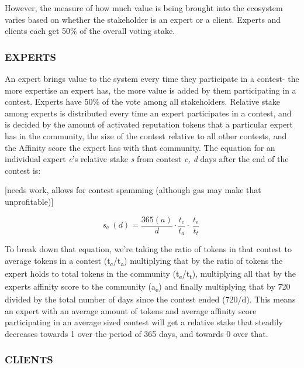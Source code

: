 However, the measure of how much value is being brought into the
ecosystem varies based on whether the stakeholder is an expert or a
client. Experts and clients each get 50\% of the overall voting stake.

\subsubsection{\texorpdfstring{\protect\hypertarget{_ad2r88v0seab}{}{\protect\hypertarget{_Toc462050418}{}{}}EXPERTS}{EXPERTS}}\label{experts}

An expert brings value to the system every time they participate in a
contest- the more expertise an expert has, the more value is added by
them participating in a contest. Experts have 50\% of the vote among all
stakeholders. Relative stake among experts is distributed every time an
expert participates in a contest, and is decided by the amount of
activated reputation tokens that a particular expert has in the
community, the size of the contest relative to all other contests, and
the Affinity score the expert has with that community. The equation for
an individual expert \emph{e}'s relative stake \emph{s} from contest
\emph{c, d} days after the end of the contest is:

{[}needs work, allows for contest spamming (although gas may make that
unprofitable){]}

\[s_{\text{e\ }}(d) = \frac{365(a)}{d} \cdot \frac{t_{c}}{t_{a}} \cdot \ \frac{t_{e}}{t_{t}}\ \]

To break down that equation, we're taking the ratio of tokens in that
contest to average tokens in a contest
(t\textsubscript{c}/t\textsubscript{a}) multiplying that by the ratio of
tokens the expert holds to total tokens in the community
(t\textsubscript{e}/t\textsubscript{t}), multiplying all that by the
experts affinity score to the community (a\textsubscript{e}) and finally
multiplying that by 720 divided by the total number of days since the
contest ended (720/d). This means an expert with an average amount of
tokens and average affinity score participating in an average sized
contest will get a relative stake that steadily decreases towards 1 over
the period of 365 days, and towards 0 over that.

\subsubsection{\texorpdfstring{\protect\hypertarget{_qnpy2c4d2iai}{}{\protect\hypertarget{_Toc462050419}{}{}}CLIENTS}{CLIENTS}}\label{clients}

